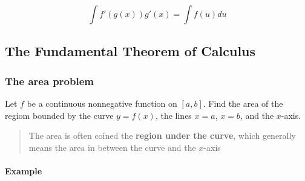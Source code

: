 \documentclass[
]{article}
\begin{document}
\[ \int f'(g(x))g'(x) = \int f(u)du \]

\hypertarget{the-fundamental-theorem-of-calculus}{%
\subsection{The Fundamental Theorem of
Calculus}\label{the-fundamental-theorem-of-calculus}}

\hypertarget{the-area-problem}{%
\subsubsection{The area problem}\label{the-area-problem}}

Let \(f\) be a continuous nonnegative function on \([a,b]\). Find the
area of the regiom bounded by the curve \(y=f(x)\), the lines \(x=a\),
\(x=b\), and the \(x\)-axis.

\begin{quote}
The area is often coined the \textbf{region under the curve}, which
generally means the area in between the curve and the \(x\)-axis
\end{quote}

\hypertarget{example-3}{%
\paragraph{Example}\label{example-3}}
\end{document}
